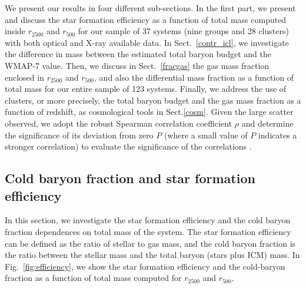 \documentclass{aa}
\begin{document}
We present our results in four different sub-sections. In the first
part, we present and discuss the star formation efficiency
 as a function of total mass computed inside $r_{2500}$ and
$r_{500}$ for our sample of 37 systems (nine groups and 28 clusters) with
both optical and X-ray available data. In Sect.~\ref{contr_icl}, we investigate the
difference in mass between the estimated total baryon budget and the
WMAP-7 value. 
Then, we discuss in Sect.~\ref{fracgas} the gas mass fraction enclosed in
$r_{2500}$ and $r_{500}$, and also the differential mass fraction as
a function of total mass for our entire sample of 123 systems.
Finally, we address the use of clusters, or more precisely, the total baryon budget and the 
gas mass fraction as a function of redshift, as cosmological tools in Sect.\ref{cosm}.
Given the large scatter observed, we adopt the robust Spearman correlation
coefficient $\rho$ and determine the significance of its deviation from zero $P$ (where 
a small value of $P$ indicates a stronger correlation) to evaluate the significance of the correlations
\citep[see][]{press92}. 



\subsection{Cold baryon fraction and star formation efficiency}
\label{cb}

In this section, we investigate the star
  formation efficiency and the cold baryon fraction dependences on
  total mass of the system. The star formation efficiency can be
  defined as the ratio of stellar to gas mass, and the cold baryon
  fraction is the ratio between the stellar mass and the total baryon
  (stars plus ICM) mass.  In Fig.~\ref{fig:efficiency}, we show the
  star formation efficiency and the cold-baryon fraction as a function
  of total mass computed for $r_{2500}$ and $r_{500}$.  
  
\end{document}
